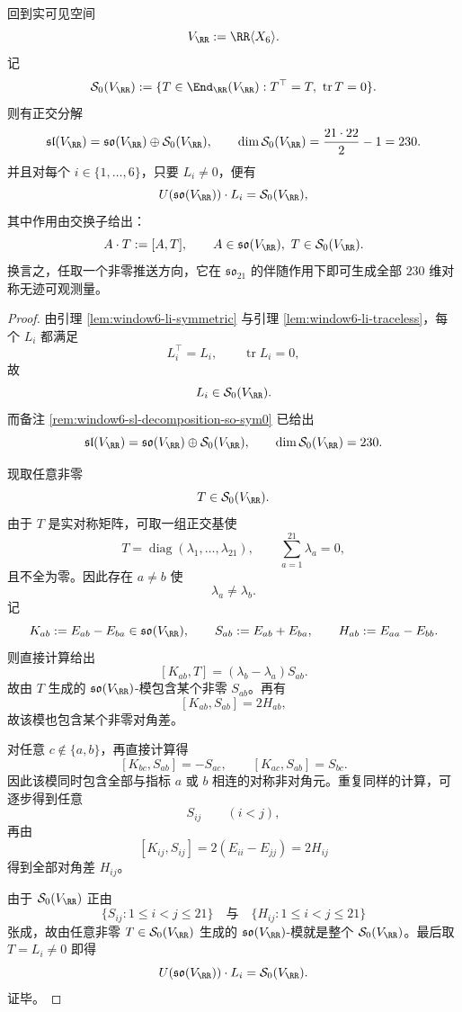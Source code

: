 \begin{theorem}\label{thm:conclusion-window6-so21-orbit-saturation-sym0}
回到实可见空间
\[
V_{\RR}:=\RR\langle X_6\rangle.
\]
记
\[
\mathcal S_0(V_{\RR})
:=
\{T\in \End_{\RR}(V_{\RR}):T^\top=T,\ \operatorname{tr}T=0\}.
\]
则有正交分解
\[
\mathfrak{sl}(V_{\RR})
=
\mathfrak{so}(V_{\RR})\oplus \mathcal S_0(V_{\RR}),
\qquad
\dim \mathcal S_0(V_{\RR})=\frac{21\cdot 22}{2}-1=230.
\]
并且对每个 \(i\in\{1,\dots,6\}\)，只要 \(L_i\neq 0\)，便有
\[
U(\mathfrak{so}(V_{\RR}))\cdot L_i=\mathcal S_0(V_{\RR}),
\]
其中作用由交换子给出：
\[
A\cdot T:=[A,T],
\qquad
A\in \mathfrak{so}(V_{\RR}),\ T\in \mathcal S_0(V_{\RR}).
\]
换言之，任取一个非零推送方向，它在 \(\mathfrak{so}_{21}\) 的伴随作用下即可生成全部 \(230\) 维对称无迹可观测量。
\end{theorem}
\begin{proof}
由引理 \ref{lem:window6-li-symmetric} 与引理 \ref{lem:window6-li-traceless}，每个 \(L_i\) 都满足
\[
L_i^\top=L_i,
\qquad
\operatorname{tr}L_i=0,
\]
故
\[
L_i\in \mathcal S_0(V_{\RR}).
\]
而备注 \ref{rem:window6-sl-decomposition-so-sym0} 已给出
\[
\mathfrak{sl}(V_{\RR})
=
\mathfrak{so}(V_{\RR})\oplus \mathcal S_0(V_{\RR}),
\qquad
\dim \mathcal S_0(V_{\RR})=230.
\]

现取任意非零
\[
T\in \mathcal S_0(V_{\RR}).
\]
由于 \(T\) 是实对称矩阵，可取一组正交基使
\[
T=\operatorname{diag}(\lambda_1,\dots,\lambda_{21}),
\qquad
\sum_{a=1}^{21}\lambda_a=0,
\]
且不全为零。因此存在 \(a\neq b\) 使
\[
\lambda_a\neq \lambda_b.
\]
记
\[
K_{ab}:=E_{ab}-E_{ba}\in\mathfrak{so}(V_{\RR}),
\qquad
S_{ab}:=E_{ab}+E_{ba},
\qquad
H_{ab}:=E_{aa}-E_{bb}.
\]
则直接计算给出
\[
[K_{ab},T]=(\lambda_b-\lambda_a)S_{ab}.
\]
故由 \(T\) 生成的 \(\mathfrak{so}(V_{\RR})\)-模包含某个非零 \(S_{ab}\)。再有
\[
[K_{ab},S_{ab}]=2H_{ab},
\]
故该模也包含某个非零对角差。

对任意 \(c\notin\{a,b\}\)，再直接计算得
\[
[K_{bc},S_{ab}]=-S_{ac},
\qquad
[K_{ac},S_{ab}]=S_{bc}.
\]
因此该模同时包含全部与指标 \(a\) 或 \(b\) 相连的对称非对角元。重复同样的计算，可逐步得到任意
\[
S_{ij}\qquad (i<j),
\]
再由
\[
[K_{ij},S_{ij}]=2(E_{ii}-E_{jj})=2H_{ij}
\]
得到全部对角差 \(H_{ij}\)。

由于 \(\mathcal S_0(V_{\RR})\) 正由
\[
\{S_{ij}:1\le i<j\le 21\}
\quad\text{与}\quad
\{H_{ij}:1\le i<j\le 21\}
\]
张成，故由任意非零 \(T\in \mathcal S_0(V_{\RR})\) 生成的 \(\mathfrak{so}(V_{\RR})\)-模就是整个 \(\mathcal S_0(V_{\RR})\)。最后取 \(T=L_i\neq 0\) 即得
\[
U(\mathfrak{so}(V_{\RR}))\cdot L_i=\mathcal S_0(V_{\RR}).
\]
证毕。
\end{proof}

